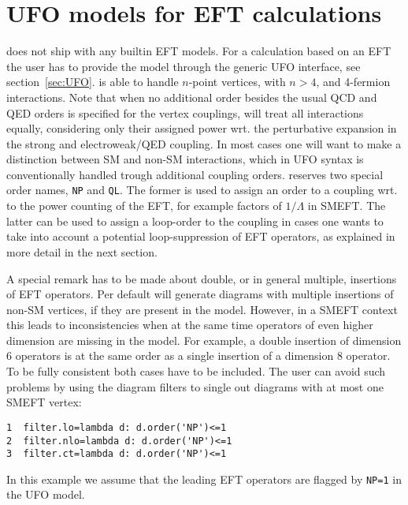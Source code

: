 \section{UFO models for EFT calculations}
\gosam does not ship with any builtin EFT models. For a calculation based on an EFT the user has to provide the model through the generic UFO interface, see section~\ref{sec:UFO}. \gosam is able to handle $n$-point vertices, with $n>4$, and 4-fermion interactions. Note that when no additional order besides the usual QCD and QED orders is specified for the vertex couplings, \gosam will treat all interactions equally, considering only their assigned power wrt. the perturbative expansion in the strong and electroweak/QED coupling. In most cases one will want to make a distinction between SM and non-SM interactions, which in UFO syntax is conventionally handled trough additional coupling orders. \gosam reserves two special order names, \texttt{NP} and \texttt{QL}. The former is used to assign an order to a coupling wrt. to the power counting of the EFT, for example factors of $1/\Lambda$ in SMEFT. The latter can be used to assign a loop-order to the coupling in cases one wants to take into account a potential loop-suppression of EFT operators, as explained in more detail in the next section.

A special remark has to be made about double, or in general multiple, insertions of EFT operators. Per default \gosam will generate diagrams with multiple insertions of non-SM vertices, if they are present in the model. However, in a SMEFT context this leads to inconsistencies when at the same time operators of even higher dimension are missing in the model. For example, a double insertion of dimension 6 operators is at the same order as a single insertion of a dimension 8 operator. To be fully consistent both cases have to be included. The user can avoid such problems by using the \python diagram filters to single out diagrams with at most one SMEFT vertex:
\begin{lstlisting}[gobble=3,style=py]
1  filter.lo=lambda d: d.order('NP')<=1
2  filter.nlo=lambda d: d.order('NP')<=1
3  filter.ct=lambda d: d.order('NP')<=1
\end{lstlisting}
In this example we assume that the leading EFT operators are flagged by \texttt{NP=1} in the UFO model.

